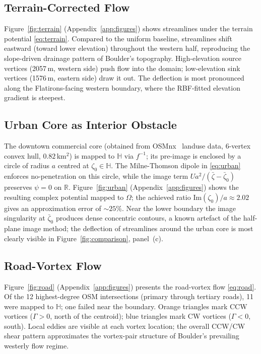 \documentclass[11pt]{article}
\newcommand{\HH}{\mathbb{H}}          %
\newcommand{\RR}{\mathbb{R}}
\newcommand{\Imag}{\mathrm{Im}}
\begin{document}
\subsection{Terrain-Corrected Flow}

Figure~\ref{fig:terrain} (Appendix~\ref{app:figures}) shows streamlines under
the terrain potential \eqref{eq:terrain}. Compared to the uniform baseline,
streamlines shift eastward (toward lower elevation) throughout the western half,
reproducing the slope-driven drainage pattern of Boulder's topography.
High-elevation source vertices (2057\,m, western side) push flow into the
domain; low-elevation sink vertices (1576\,m, eastern side) draw it out.
The deflection is most pronounced along the Flatirons-facing western boundary,
where the RBF-fitted elevation gradient is steepest.

\subsection{Urban Core as Interior Obstacle}

The downtown commercial core (obtained from OSMnx~\citep{BG17} landuse
data, 6-vertex convex hull, $0.82$\,km$^2$) is mapped to $\HH$ via $f^{-1}$;
its pre-image is enclosed by a circle of radius $a$ centred at $\zeta_0\in\HH$.
The Milne-Thomson dipole in \eqref{eq:urban} enforces no-penetration on this
circle, while the image term $Ua^2/(\bar\zeta-\bar\zeta_0)$ preserves
$\psi=0$ on $\RR$.  Figure~\ref{fig:urban} (Appendix~\ref{app:figures})
shows the resulting complex potential mapped to $\Omega$; the achieved ratio
$\Imag(\zeta_0)/a\approx2.02$ gives an approximation error of $\sim\!25\%$.
Near the lower boundary the image singularity at $\bar\zeta_0$ produces dense
concentric contours, a known artefact of the half-plane image method; the
deflection of streamlines around the urban core is most clearly visible in
Figure~\ref{fig:comparison}, panel~(c).

\subsection{Road-Vortex Flow}

Figure~\ref{fig:road} (Appendix~\ref{app:figures}) presents the road-vortex
flow \eqref{eq:road}. Of the 12 highest-degree OSM intersections (primary
through tertiary roads), 11 were mapped to $\HH$; one failed near the boundary.
Orange triangles mark CCW vortices ($\Gamma>0$, north of the centroid); blue
triangles mark CW vortices ($\Gamma<0$, south). Local eddies are visible at
each vortex location; the overall CCW/CW shear pattern approximates the
vortex-pair structure of Boulder's prevailing westerly flow regime.
\end{document}
